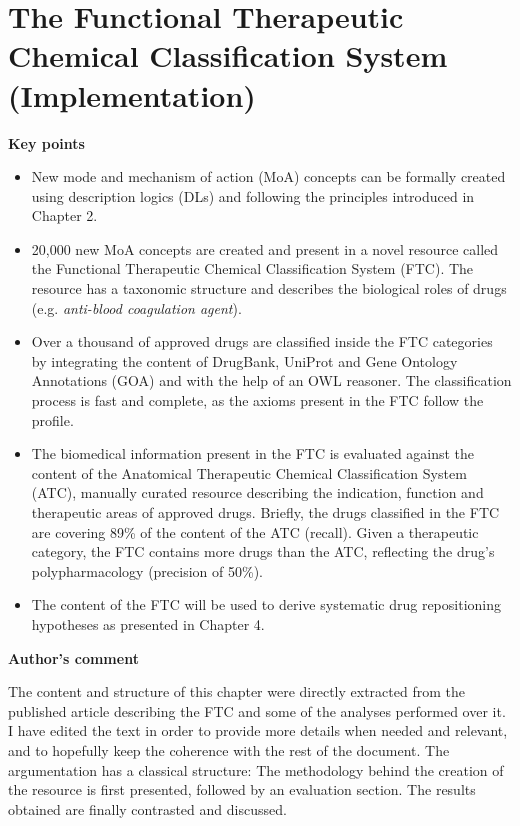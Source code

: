 \chapter{The Functional Therapeutic Chemical Classification System (Implementation)}

\textbf{Key points}
\begin{itemize}
  \item New mode and mechanism of action (MoA) concepts can be formally created using description logics (DLs) and following the principles introduced in Chapter 2.
  \item 20,000 new MoA concepts are created and present in a novel resource called the Functional Therapeutic Chemical Classification System (FTC). The resource has a taxonomic structure and describes the biological roles of drugs (e.g. \emph{anti-blood coagulation agent}).
  \item Over a thousand of approved drugs are classified inside the FTC categories by integrating the content of DrugBank, UniProt and Gene Ontology Annotations (GOA) and with the help of an OWL reasoner. The classification process is fast and complete, as the axioms present in the FTC follow the  profile.
  \item The biomedical information present in the FTC is evaluated against the content of the Anatomical Therapeutic Chemical Classification System (ATC), manually curated resource describing the indication, function and therapeutic areas of approved drugs. Briefly, the drugs classified in the FTC are covering 89\% of the content of the ATC (recall). Given a therapeutic category, the FTC contains more drugs than the ATC, reflecting the drug's polypharmacology (precision of 50\%).
  \item The content of the FTC will be used to derive systematic drug repositioning hypotheses as presented in Chapter 4.
\end{itemize}

\textbf{Author's comment}

The content and structure of this chapter were directly extracted from the published article \citep{croset2013functional} describing the FTC and some of the analyses performed over it. I have edited the text in order to provide more details when needed and relevant, and to hopefully keep the coherence with the rest of the document. The argumentation has a classical structure: The methodology behind the creation of the resource is first presented, followed by an evaluation section. The results obtained are finally contrasted and discussed.

